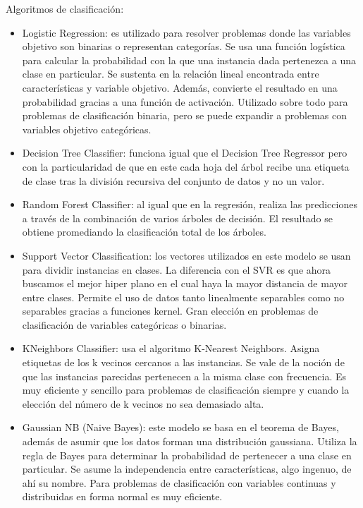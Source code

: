 Algoritmos de clasificación:

\begin{itemize} \label{algoritmosclas}
    \item Logistic Regression: es utilizado para resolver problemas donde las variables objetivo son binarias o representan categorías. Se usa una función logística para calcular la probabilidad con la que una instancia dada pertenezca a una clase en particular. Se sustenta en la relación lineal encontrada entre características y variable objetivo. Además, convierte el resultado en una probabilidad gracias a una función de activación. Utilizado sobre todo para problemas de clasificación binaria, pero se puede expandir a problemas con variables objetivo categóricas.
    \item Decision Tree Classifier: funciona igual que el Decision Tree Regressor pero con la particularidad de que en este cada hoja del árbol recibe una etiqueta de clase tras la división recursiva del conjunto de datos y no un valor.
    \item Random Forest Classifier: al igual que en la regresión, realiza las predicciones a través de la combinación de varios árboles de decisión. El resultado se obtiene promediando la clasificación total de los árboles.
    \item Support Vector Classification: los vectores utilizados en este modelo se usan para dividir instancias en clases. La diferencia con el SVR es que ahora buscamos el mejor hiper plano en el cual haya la mayor distancia de mayor entre clases. Permite el uso de datos tanto linealmente separables como no separables gracias a funciones kernel. Gran elección en problemas de clasificación de variables categóricas o binarias.
    \item KNeighbors Classifier: usa el algoritmo K-Nearest Neighbors. Asigna etiquetas de los k vecinos cercanos a las instancias. Se vale de la noción de que las instancias parecidas pertenecen a la misma clase con frecuencia. Es muy eficiente y sencillo para problemas de clasificación siempre y cuando la elección del número de k vecinos no sea demasiado alta.
    \item Gaussian NB (Naive Bayes): este modelo se basa en el teorema de Bayes, además de asumir que los datos forman una distribución gaussiana. Utiliza la regla de Bayes para determinar la probabilidad de pertenecer a una clase en particular. Se asume la independencia entre características, algo ingenuo, de ahí su nombre. Para problemas de clasificación con variables continuas y distribuidas en forma normal es muy eficiente.
\end{itemize}

